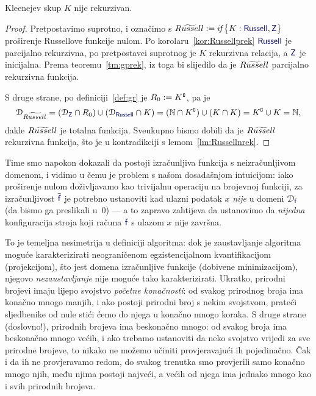 \begin{teorem}[{name=[nerekurzivnost Kleenejevog skupa]}]\label{tm:DRnrek}
Kleenejev skup $K$ nije rekurzivan.
\end{teorem}
\begin{proof}
Pretpostavimo suprotno, i označimo s $\rus:=\IF{K:\f{Russell},\f Z}$ proširenje Russellove funkcije nulom.
Po korolaru~\ref{kor:Russellprek} $\f{Russell}$ je parcijalno rekurzivna, po pretpostavci suprotnog je $K$ rekurzivna relacija, a $\f Z$ je inicijalna. Prema teoremu~\ref{tm:gprek}, iz toga bi slijedilo da je $\textit{$R\widetilde{usse}ll$}$ parcijalno rekurzivna funkcija.

S druge strane, po definiciji~\ref{def:gr} je $R_0:=K\sp{{\scriptscriptstyle\complement}}$, pa je
\begin{equation}
    \dom{\rus}=(\dom{\f Z}\cap R_0)\cup(\dom{\f{Russell}}\cap K)=(\N\cap K\kompl)\cup(K\cap K)=K\kompl\cup K=\N\text,
\end{equation}
dakle $\textit{$R\widetilde{usse}ll$}$ je totalna funkcija. Sveukupno bismo dobili da je $\textit{$R\widetilde{usse}ll$}$ rekurzivna funkcija, što je u kontradikciji s lemom~\ref{lm:Russellnrek}.%
\end{proof}

Time smo napokon dokazali da postoji izračunljiva funkcija s neizračunljivom domenom, i vidimo u čemu je problem s našom dosadašnjom intuicijom: iako proširenje nulom doživljavamo kao trivijalnu operaciju na brojevnoj funkciji, za izračunljivost $\tilde{\f f}$ je potrebno ustanoviti kad ulazni podatak $x$ \emph{nije} u domeni $\dom{\f f}$ (da bismo ga preslikali u~$0$) --- a to zapravo zahtijeva da ustanovimo da \emph{nijedna} konfiguracija stroja koji računa $\f f$ s ulazom $x$ nije završna.

To je temeljna nesimetrija u definiciji algoritma: dok je zaustavljanje algoritma moguće karakterizirati neograničenom egzistencijalnom kvantifikacijom (projekcijom), što jest domena izračunljive funkcije (dobivene minimizacijom), njegovo \emph{nezaustavljanje} nije moguće tako karakterizirati. Ukratko, prirodni brojevi imaju lijepo svojstvo \emph{početne konačnosti}: od svakog prirodnog broja ima konačno mnogo manjih, i ako postoji prirodni broj s nekim svojstvom, prateći sljedbenike od nule stići ćemo do njega u konačno mnogo koraka. S druge strane (doslovno!), prirodnih brojeva ima beskonačno mnogo: od svakog broja ima beskonačno mnogo većih, i ako trebamo ustanoviti da neko svojstvo vrijedi za sve prirodne brojeve, to nikako ne možemo učiniti provjeravajući ih pojedinačno. Čak i da ih ne provjeravamo redom, do svakog trenutka smo provjerili samo konačno mnogo njih, među njima postoji najveći, a većih od njega ima jednako mnogo kao i svih prirodnih brojeva.

